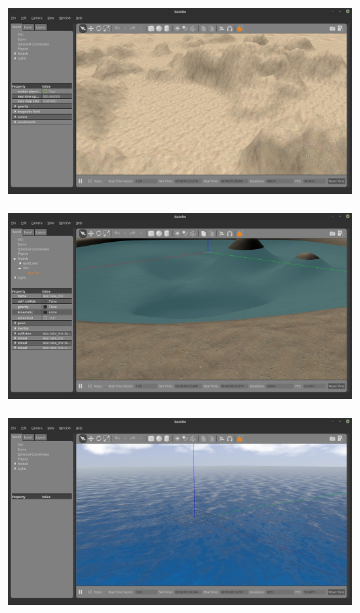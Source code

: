 \begin{figure}[H]
    \centering
    \caption{Interface gráfica do simulador Gazebo}
    \label{fig:gazebo}
    \begin{subfigure}[t]{0.45\textwidth}
        \includegraphics[width=\textwidth]{dados/figuras/gazebo1.jpeg}
    \end{subfigure}
    \begin{subfigure}[t]{0.45\textwidth}
        \includegraphics[width=\textwidth]{dados/figuras/gazebo2.jpeg}
    \end{subfigure}
    \begin{subfigure}[t]{0.45\textwidth}
        \includegraphics[width=\textwidth]{dados/figuras/gazebo3.jpeg}

\end{subfigure}
\end{figure}
